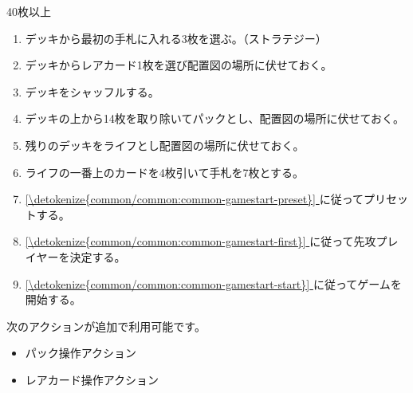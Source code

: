 \documentclass[letterpaper,10pt,dvipdfmx]{sphinxmanual}
\begin{document}
\sphinxAtStartPar
{}

\sphinxAtStartPar
40枚以上

\sphinxAtStartPar
{}
\begin{enumerate}
%
\item {} 
\sphinxAtStartPar
デッキから最初の手札に入れる3枚を選ぶ。（ストラテジー）

\item {} 
\sphinxAtStartPar
デッキからレアカード1枚を選び配置図の場所に伏せておく。

\item {} 
\sphinxAtStartPar
デッキをシャッフルする。

\item {} 
\sphinxAtStartPar
デッキの上から14枚を取り除いてパックとし、配置図の場所に伏せておく。

\item {} 
\sphinxAtStartPar
残りのデッキをライフとし配置図の場所に伏せておく。

\item {} 
\sphinxAtStartPar
ライフの一番上のカードを4枚引いて手札を7枚とする。

\item {} 
\sphinxAtStartPar
\hyperref[\detokenize{common/common:common-gamestart-preset}]{\ref{\detokenize{common/common:common-gamestart-preset}} } に従ってプリセットする。

\item {} 
\sphinxAtStartPar
\hyperref[\detokenize{common/common:common-gamestart-first}]{\ref{\detokenize{common/common:common-gamestart-first}} } に従って先攻プレイヤーを決定する。

\item {} 
\sphinxAtStartPar
\hyperref[\detokenize{common/common:common-gamestart-start}]{\ref{\detokenize{common/common:common-gamestart-start}} } に従ってゲームを開始する。

\end{enumerate}

\sphinxAtStartPar
{}

\sphinxAtStartPar
次のアクションが追加で利用可能です。
\begin{itemize}
\item {} 
\sphinxAtStartPar
パック操作アクション

\item {} 
\sphinxAtStartPar
レアカード操作アクション

\end{itemize}
\end{document}
